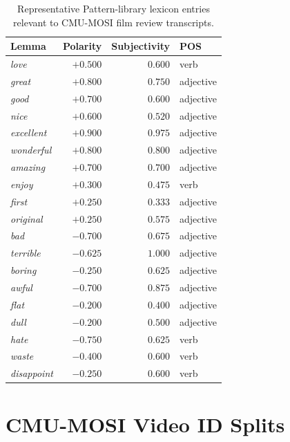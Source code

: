 \documentclass[12pt,a4paper]{article}
\theoremstyle{plain}
\theoremstyle{definition}
\begin{document}
\begin{table}[H]
\centering
\caption{Representative Pattern-library lexicon entries relevant to
         CMU-MOSI film review transcripts.}
\label{tab:lexicon_full}
\begin{tabular}{lrrl}
\toprule
Lemma & Polarity & Subjectivity & POS \\
\midrule
\textit{love}        & $+0.500$ & $0.600$ & verb \\
\textit{great}       & $+0.800$ & $0.750$ & adjective \\
\textit{good}        & $+0.700$ & $0.600$ & adjective \\
\textit{nice}        & $+0.600$ & $0.520$ & adjective \\
\textit{excellent}   & $+0.900$ & $0.975$ & adjective \\
\textit{wonderful}   & $+0.800$ & $0.800$ & adjective \\
\textit{amazing}     & $+0.700$ & $0.700$ & adjective \\
\textit{enjoy}       & $+0.300$ & $0.475$ & verb \\
\textit{first}       & $+0.250$ & $0.333$ & adjective \\
\textit{original}    & $+0.250$ & $0.575$ & adjective \\
\midrule
\textit{bad}         & $-0.700$ & $0.675$ & adjective \\
\textit{terrible}    & $-0.625$ & $1.000$ & adjective \\
\textit{boring}      & $-0.250$ & $0.625$ & adjective \\
\textit{awful}       & $-0.700$ & $0.875$ & adjective \\
\textit{flat}        & $-0.200$ & $0.400$ & adjective \\
\textit{dull}        & $-0.200$ & $0.500$ & adjective \\
\textit{hate}        & $-0.750$ & $0.625$ & verb \\
\textit{waste}       & $-0.400$ & $0.600$ & verb \\
\textit{disappoint}  & $-0.250$ & $0.600$ & verb \\
\bottomrule
\end{tabular}
\end{table}

\section{CMU-MOSI Video ID Splits}
\label{app:splits}
\end{document}
